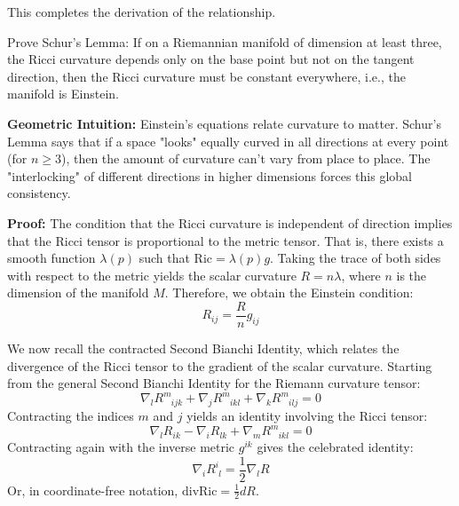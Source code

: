 \begin{solution}
This completes the derivation of the relationship.
\end{solution}

\begin{exercise}
\label{geometry:2011:12}
Prove Schur's Lemma: If on a Riemannian manifold of dimension at least three, the Ricci curvature depends only on the base point but not on the tangent direction, then the Ricci curvature must be constant everywhere, i.e., the manifold is Einstein.
\end{exercise}

\begin{solution}
\textbf{Geometric Intuition:} Einstein's equations relate curvature to matter. Schur's Lemma says that if a space "looks" equally curved in all directions at every point (for $n \geq 3$), then the amount of curvature can't vary from place to place. The "interlocking" of different directions in higher dimensions forces this global consistency.

\textbf{Proof:} The condition that the Ricci curvature is independent of direction implies that the Ricci tensor is proportional to the metric tensor. That is, there exists a smooth function $\lambda(p)$ such that $\mathrm{Ric} = \lambda(p) g$.
Taking the trace of both sides with respect to the metric yields the scalar curvature $R = n \lambda$, where $n$ is the dimension of the manifold $M$. Therefore, we obtain the Einstein condition:
\[ R_{ij} = \frac{R}{n} g_{ij} \]

We now recall the contracted Second Bianchi Identity, which relates the divergence of the Ricci tensor to the gradient of the scalar curvature. Starting from the general Second Bianchi Identity for the Riemann curvature tensor:
\[ \nabla_l R^m_{\phantom{m}ijk} + \nabla_j R^m_{\phantom{m}ikl} + \nabla_k R^m_{\phantom{m}ilj} = 0 \]
Contracting the indices $m$ and $j$ yields an identity involving the Ricci tensor:
\[ \nabla_l R_{ik} - \nabla_i R_{lk} + \nabla_m R^m_{\phantom{m}ikl} = 0 \]
Contracting again with the inverse metric $g^{ik}$ gives the celebrated identity:
\[ \nabla_i R^i_{\phantom{i}l} = \frac{1}{2} \nabla_l R \]
Or, in coordinate-free notation, $\mathrm{div} \mathrm{Ric} = \frac{1}{2} dR$.


\end{solution}
